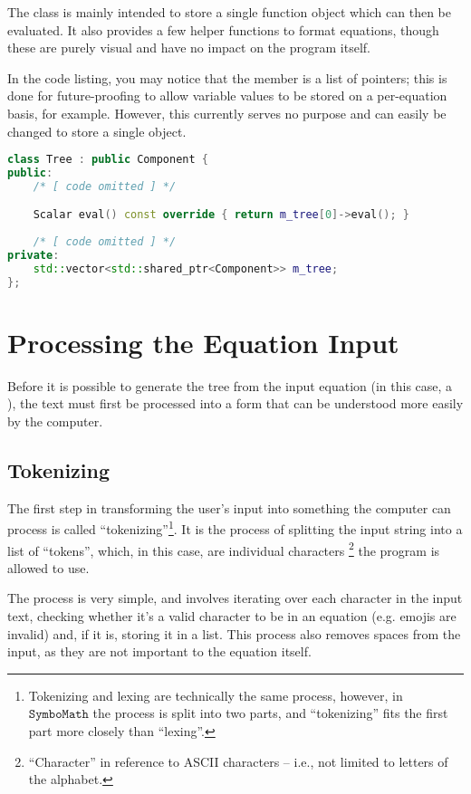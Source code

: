 \documentclass[12pt]{article}
\def\Symbo{{$\texttt{SymboMath}$}}
\begin{document}
The  class is mainly intended to store a single function object which can then be evaluated. It also provides a few helper functions to format equations, though these are purely visual and have no impact on the program itself.

In the code listing, you may notice that the  member is a list of pointers; this is done for future-proofing to allow variable values to be stored on a per-equation basis, for example. However, this currently serves no purpose and can easily be changed to store a single object.

\vspace{0.25cm}

\begin{lstlisting}[language=C++]
class Tree : public Component {
public:
	/* [ code omitted ] */

	Scalar eval() const override { return m_tree[0]->eval(); }
	
	/* [ code omitted ] */
private:
	std::vector<std::shared_ptr<Component>> m_tree;
};
\end{lstlisting}

\pagebreak

\section{Processing the Equation Input}

Before it is possible to generate the tree from the input equation (in this case, a ), the text must first be processed into a form that can be understood more easily by the computer.

\subsection{Tokenizing}

The first step in transforming the user's input into something the computer can process is called ``tokenizing''\footnote{Tokenizing and lexing are technically the same process, however, in \Symbo{} the process is split into two parts, and ``tokenizing'' fits the first part more closely than ``lexing''.}. It is the process of splitting the input string into a list of ``tokens'', which, in this case, are individual characters \footnote{``Character'' in reference to ASCII characters -- i.e., not limited to letters of the alphabet.} the program is allowed to use.

The process is very simple, and involves iterating over each character in the input text, checking whether it's a valid character to be in an equation (e.g. emojis are invalid) and, if it is, storing it in a list. This process also removes spaces from the input, as they are not important to the equation itself.
\end{document}
